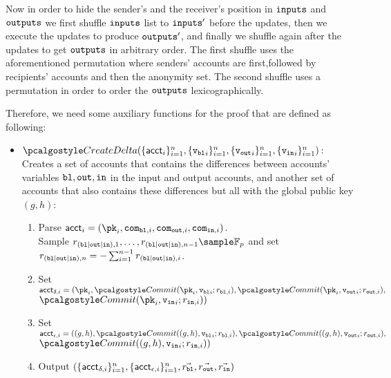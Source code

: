 Now in order to hide the sender's and the receiver's position in ${\textup{\texttt{inputs}}}$ and ${\textup{\texttt{outputs}}}$ we first shuffle ${\textup{\texttt{inputs}}}$ list to ${\textup{\texttt{inputs}}}'$ before the updates, then we execute the updates to produce ${\textup{\texttt{outputs}}}'$, and finally we shuffle again after the updates to get ${\textup{\texttt{outputs}}}$ in arbitrary order. The first shuffle uses the aforementioned permutation where senders' accounts are first,followed by recipients' accounts and then the anonymity set. The second shuffle uses a permutation in order to order the ${\textup{\texttt{outputs}}}$ lexicographically.

Therefore, we need some auxiliary functions for the proof that are defined as following:

\begin{itemize}
    \item $\createdelta(\{\acct_i\}_{i=1}^{n}, \{{\vbl}_i\}_{i=1}^{n}, \{{\vout}_i\}_{i=1}^{n}, \{{\vin}_i\}_{i=1}^{n})$: Creates a set of accounts that contains the differences between accounts' variables $\textup{\texttt{{bl}}}, \textup{\texttt{{out}}}, \textup{\texttt{{in}}}$ in the input and output accounts, and another set of accounts that also contains these differences but all with the global public key $(g,h)$:
    \begin{enumerate}
        \item Parse $\acct_i = (\pk_i, \com_{\varbl,i}, \com_{\varout,i}, \com_{\varin,i})$. \\ Sample $r_{(\varbl|\varout|\varin),1}, \dots, r_{ (\varbl|\varout|\varin),n-1} \sample \mathbb{F}_p$ and set $r_{(\textup{\texttt{{bl}}}|\textup{\texttt{{out}}}|\textup{\texttt{{in}}}),n} = -\sum_{i=1}^{n-1} r_{(\textup{\texttt{{bl}}}|\textup{\texttt{{out}}}|\textup{\texttt{{in}}}),i}$. 
        \item Set $\acct_{\delta,i} = (\pk_i, \commit(\pk_i,{\vbl}_i; r_{\varbl,i}), \commit(\pk_i,{\vout}_i; r_{\varout,i}),$ \\ $ \commit(\pk_i,{\vin}_i; r_{\varin,i}))$
        \item Set $\acct_{\epsilon,i} = ((g,h), \commit((g,h),{\vbl}_i; r_{\varbl,i}), \commit((g,h),{\vout}_i; r_{\varout,i}),$ \\ $ \commit((g,h),{\vin}_i; r_{\varin,i}))$
        \item Output $(\{\textup{\textsf{acct}}_{\delta,i}\}_{i=1}^n, \{\textup{\textsf{acct}}_{\epsilon,i}\}_{i=1}^n, \vec{r_{\textup{\texttt{{bl}}}}}, \vec{r_{\textup{\texttt{{out}}}}}, \vec{r_{\textup{\texttt{{in}}}}})$
    \end{enumerate}
    \vspace{0.3cm}


\end{itemize}
